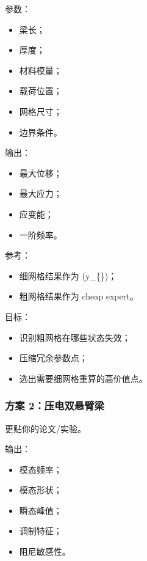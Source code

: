 \documentclass[
  12pt,
]{ctexart}
\providecommand{\tightlist}{%
  \setlength{\itemsep}{0pt}\setlength{\parskip}{0pt}}
\begin{document}
参数：

\begin{itemize}
\tightlist
\item
  梁长；
\item
  厚度；
\item
  材料模量；
\item
  载荷位置；
\item
  网格尺寸；
\item
  边界条件。
\end{itemize}

输出：

\begin{itemize}
\tightlist
\item
  最大位移；
\item
  最大应力；
\item
  应变能；
\item
  一阶频率。
\end{itemize}

参考：

\begin{itemize}
\tightlist
\item
  细网格结果作为 (y\_\{\})；
\item
  粗网格结果作为 cheap expert。
\end{itemize}

目标：

\begin{itemize}
\tightlist
\item
  识别粗网格在哪些状态失效；
\item
  压缩冗余参数点；
\item
  选出需要细网格重算的高价值点。
\end{itemize}

\subsubsection{方案
2：压电双悬臂梁}\label{ux65b9ux6848-2ux538bux7535ux53ccux60acux81c2ux6881}

更贴你的论文/实验。

输出：

\begin{itemize}
\tightlist
\item
  模态频率；
\item
  模态形状；
\item
  瞬态峰值；
\item
  调制特征；
\item
  阻尼敏感性。
\end{itemize}
\end{document}
